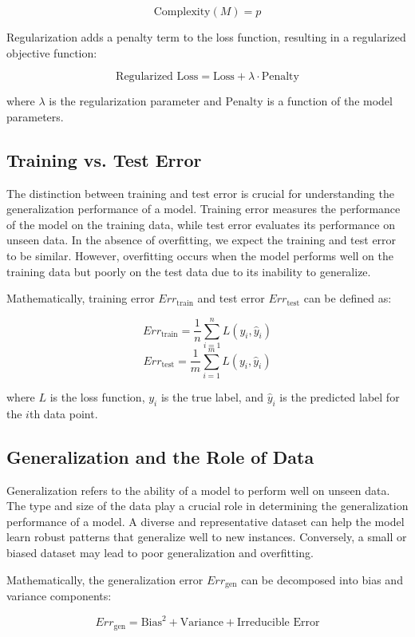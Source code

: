 \documentclass[12pt]{book} %
\begin{document}
\[ \text{Complexity}(M) = p \]

Regularization adds a penalty term to the loss function, resulting in a regularized objective function:

\[ \text{Regularized Loss} = \text{Loss} + \lambda \cdot \text{Penalty} \]

where \(\lambda\) is the regularization parameter and \(\text{Penalty}\) is a function of the model parameters.

\subsection{Training vs. Test Error}

The distinction between training and test error is crucial for understanding the generalization performance of a model. Training error measures the performance of the model on the training data, while test error evaluates its performance on unseen data. In the absence of overfitting, we expect the training and test error to be similar. However, overfitting occurs when the model performs well on the training data but poorly on the test data due to its inability to generalize.

Mathematically, training error \(Err_{\text{train}}\) and test error \(Err_{\text{test}}\) can be defined as:

\[ Err_{\text{train}} = \frac{1}{n} \sum_{i=1}^{n} L(y_i, \hat{y}_i) \]
\[ Err_{\text{test}} = \frac{1}{m} \sum_{i=1}^{m} L(y_i, \hat{y}_i) \]

where \(L\) is the loss function, \(y_i\) is the true label, and \(\hat{y}_i\) is the predicted label for the \(i\)th data point. 

\subsection{Generalization and the Role of Data}

Generalization refers to the ability of a model to perform well on unseen data. The type and size of the data play a crucial role in determining the generalization performance of a model. A diverse and representative dataset can help the model learn robust patterns that generalize well to new instances. Conversely, a small or biased dataset may lead to poor generalization and overfitting.

Mathematically, the generalization error \(Err_{\text{gen}}\) can be decomposed into bias and variance components:

\[ Err_{\text{gen}} = \text{Bias}^2 + \text{Variance} + \text{Irreducible Error} \]
\end{document}

